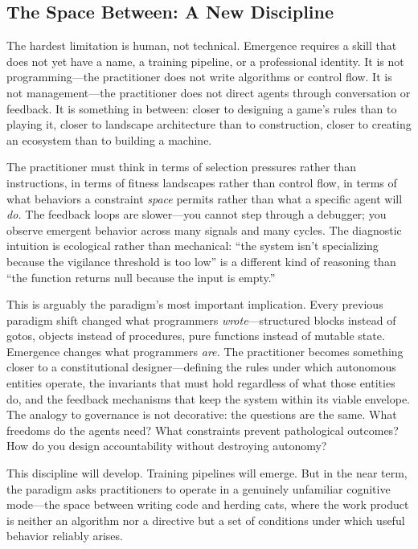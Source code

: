 \documentclass[11pt,twocolumn]{article}
\begin{document}
\subsection{The Space Between: A New Discipline}
\label{sec:between}

The hardest limitation is human, not technical.  Emergence requires a
skill that does not yet have a name, a training pipeline, or a
professional identity.  It is not programming---the practitioner does
not write algorithms or control flow.  It is not management---the
practitioner does not direct agents through conversation or feedback.
It is something in between: closer to designing a game's rules than to
playing it, closer to landscape architecture than to construction,
closer to creating an ecosystem than to building a machine.

The practitioner must think in terms of selection pressures rather than
instructions, in terms of fitness landscapes rather than control flow,
in terms of what behaviors a constraint \emph{space} permits rather than
what a specific agent will \emph{do.}  The feedback loops are slower---you
cannot step through a debugger; you observe emergent behavior across
many signals and many cycles.  The diagnostic intuition is ecological
rather than mechanical: ``the system isn't specializing because the
vigilance threshold is too low'' is a different kind of reasoning than
``the function returns null because the input is empty.''

This is arguably the paradigm's most important implication.  Every
previous paradigm shift changed what programmers \emph{wrote}---structured
blocks instead of gotos, objects instead of procedures, pure functions
instead of mutable state.  Emergence changes what programmers \emph{are.}
The practitioner becomes something closer to a constitutional
designer---defining the rules under which autonomous entities operate,
the invariants that must hold regardless of what those entities do, and
the feedback mechanisms that keep the system within its viable envelope.
The analogy to governance is not decorative: the questions are the same.
What freedoms do the agents need?  What constraints prevent pathological
outcomes?  How do you design accountability without destroying autonomy?

This discipline will develop.  Training pipelines will emerge.  But in
the near term, the paradigm asks practitioners to operate in a
genuinely unfamiliar cognitive mode---the space between writing code and
herding cats, where the work product is neither an algorithm nor a
directive but a set of conditions under which useful behavior reliably
arises.
\end{document}
